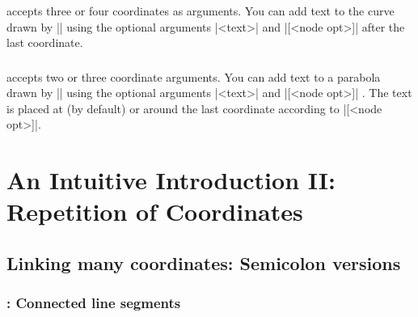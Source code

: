 \icmd{\tzbezier} accepts three or four coordinates as arguments.
You can add text to the curve drawn by |\tzbezier| using the optional arguments |{<text>}| and |[<node opt>]| after the last coordinate.

\begin{tzcode}{.3}
\end{tzcode}


\subsection{\protect\cmd{\tzparabola}}
\label{ssi:texttotzparabola}

\icmd{\tzparabola} accepts two or three coordinate arguments.
You can add text to a parabola drawn by |\tzparabola| using the optional arguments |{<text>}| and |[<node opt>]| .
The text is placed at (by default) or around the last coordinate according to |[<node opt>]|.


\begin{tzcode}{.3}
\end{tzcode}


\chapter{An Intuitive Introduction II: Repetition of Coordinates}
\label{ci:introII}

\section{Linking many coordinates: Semicolon versions}
\label{si:manycoordinates}

\subsection{\protect\cmd{\tzlines}: Connected line segments}
\label{ssi:tzlines}


